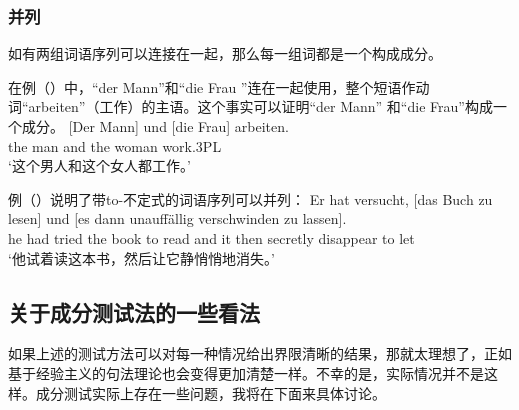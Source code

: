 \subsubsection{并列}

如有两组词语序列可以连接在一起，那么每一组词都是一个构成成分。

在例（）中，“der Mann”和“die Frau ”连在一起使用，整个短语作动词“arbeiten”（工作）的主语。这个事实可以证明“der Mann” 和“die Frau”构成一个成分。
\ea
\gll {}[Der        Mann] und [die          Frau] arbeiten.\\
     \spacebr{}the man   and \spacebr{}the woman work.3PL\\
\glt `这个男人和这个女人都工作。'
\z

例（）说明了带to-不定式的词语序列可以并列：
\ea
\gll Er hat versucht, [das Buch zu lesen] und [es dann unauffällig verschwinden zu lassen].\\
     he had tried \spacebr{}the book to read and \spacebr{}it then secretly disappear to let\\
\glt `他试着读这本书，然后让它静悄悄地消失。'
\z
{}

\subsection{关于成分测试法的一些看法}
\label{sec-status-der-ktests}

如果上述的测试方法可以对每一种情况给出界限清晰的结果，那就太理想了，正如基于经验主义的句法理论也会变得更加清楚一样。不幸的是，实际情况并不是这样。成分测试实际上存在一些问题，我将在下面来具体讨论。

